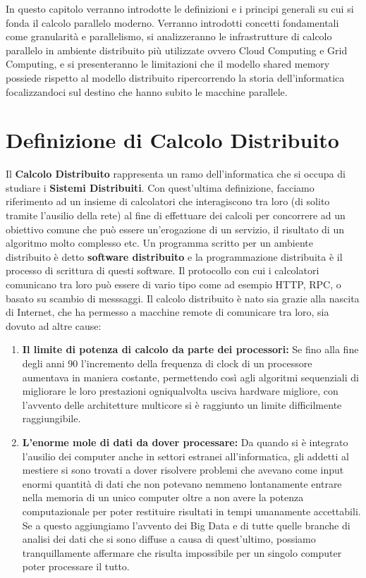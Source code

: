 In questo capitolo verranno introdotte le definizioni e i principi generali su cui si fonda il calcolo parallelo moderno. Verranno introdotti concetti fondamentali come granularità e parallelismo, si analizzeranno le infrastrutture di calcolo parallelo in ambiente distribuito più utilizzate ovvero Cloud Computing e Grid Computing, e si presenteranno le limitazioni che il modello shared memory possiede rispetto al modello distribuito ripercorrendo la storia dell'informatica focalizzandoci sul destino che hanno subito le macchine parallele.
\section{Definizione di Calcolo Distribuito}
Il \textbf{Calcolo Distribuito} rappresenta un ramo dell'informatica che si occupa di studiare i \textbf{Sistemi Distribuiti}. Con quest'ultima definizione, facciamo riferimento ad un insieme di calcolatori che interagiscono tra loro (di solito tramite l'ausilio della rete) al fine di effettuare dei calcoli per concorrere ad un obiettivo comune che può essere un'erogazione di un servizio, il risultato di un algoritmo molto complesso etc. Un programma scritto per un ambiente distribuito è detto \textbf{software distribuito} e la programmazione distribuita è il processo di scrittura di questi software. Il protocollo con cui i calcolatori comunicano tra loro può essere di vario tipo come ad esempio HTTP, RPC, o basato su scambio di messsaggi. Il calcolo distribuito è nato sia grazie alla nascita di Internet, che ha permesso a macchine remote di comunicare tra loro, sia dovuto ad altre cause:
\begin{enumerate}
  \item \textbf{Il limite di potenza di calcolo da parte dei processori:} Se fino alla fine degli anni 90 l'incremento della frequenza di clock di un processore aumentava in maniera costante, permettendo così agli algoritmi sequenziali di migliorare le loro prestazioni ogniqualvolta usciva hardware migliore, con l'avvento delle architetture multicore si è raggiunto un limite difficilmente raggiungibile.
  \item \textbf{L'enorme mole di dati da dover processare:} Da quando si è integrato l'ausilio dei computer anche in settori estranei all'informatica, gli addetti al mestiere si sono trovati a dover risolvere problemi che avevano come input enormi quantità di dati che non potevano nemmeno lontanamente entrare nella memoria di un unico computer oltre a non avere la potenza computazionale per poter restituire risultati in tempi umanamente accettabili. Se a questo aggiungiamo l'avvento dei Big Data e di tutte quelle branche di analisi dei dati che si sono diffuse a causa di quest'ultimo, possiamo tranquillamente affermare che risulta impossibile per un singolo computer poter processare il tutto. 
\end{enumerate}
